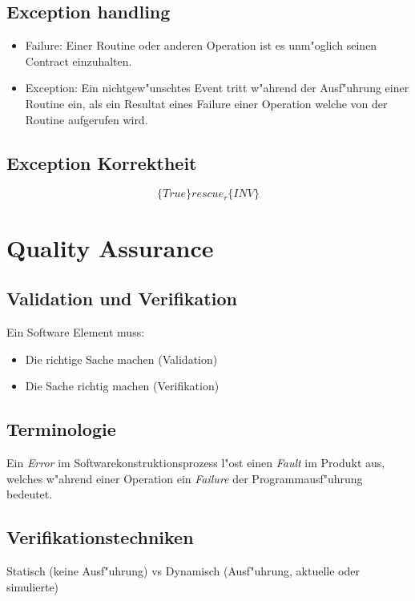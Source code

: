 \documentclass[german, 10pt, a4paper, twocolumn]{scrartcl}
\theoremstyle{definition}
\begin{document}
\subsection{Exception handling}

\begin{itemize}
	\item Failure: Einer Routine oder anderen Operation ist es unm"oglich seinen Contract einzuhalten.
	\item Exception: Ein nichtgew"unschtes Event tritt w"ahrend der Ausf"uhrung einer Routine ein, als ein Resultat eines Failure einer Operation welche von der Routine aufgerufen wird.
\end{itemize}

\subsection{Exception Korrektheit}

\begin{displaymath}
	\{ True \} rescue_r \{ INV \}
\end{displaymath}

\section{Quality Assurance}

\subsection{Validation und Verifikation}

Ein Software Element muss:
\begin{itemize}
	\item Die richtige Sache machen (Validation)
	\item Die Sache richtig machen (Verifikation)
\end{itemize}

\subsection{Terminologie}

Ein \textit{Error} im Softwarekonstruktionsprozess l"ost einen \textit{Fault} im Produkt aus, welches w"ahrend einer Operation ein \textit{Failure} der Programmausf"uhrung bedeutet.

\subsection{Verifikationstechniken}

Statisch (keine Ausf"uhrung) vs Dynamisch (Ausf"uhrung, aktuelle oder simulierte)
\end{document}
